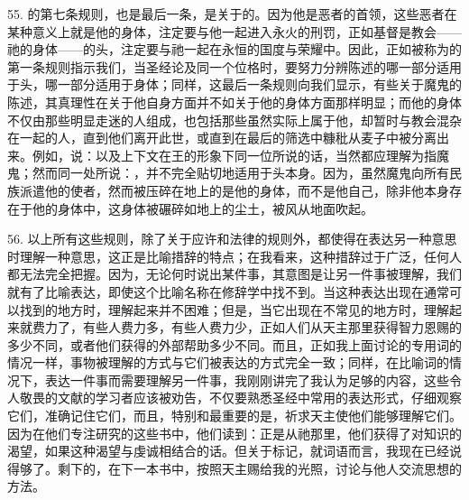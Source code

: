 55. 的第七条规则，也是最后一条，是关于的。因为他是恶者的首领，这些恶者在某种意义上就是他的身体，注定要与他一起进入永火的刑罚，正如基督是教会——祂的身体——的头，注定要与祂一起在永恒的国度与荣耀中。因此，正如被称为的第一条规则指示我们，当圣经论及同一个位格时，要努力分辨陈述的哪一部分适用于头，哪一部分适用于身体；同样，这最后一条规则向我们显示，有些关于魔鬼的陈述，其真理性在关于他自身方面并不如关于他的身体方面那样明显；而他的身体不仅由那些明显走迷的人组成，也包括那些虽然实际上属于他，却暂时与教会混杂在一起的人，直到他们离开此世，或直到在最后的筛选中糠秕从麦子中被分离出来。例如，说：以及上下文在王的形象下同一位所说的话，当然都应理解为指魔鬼；然而同一处所说：，并不完全贴切地适用于头本身。因为，虽然魔鬼向所有民族派遣他的使者，然而被压碎在地上的是他的身体，而不是他自己，除非他本身存在于他的身体中，这身体被碾碎如地上的尘土，被风从地面吹起。\par

56. 以上所有这些规则，除了关于应许和法律的规则外，都使得在表达另一种意思时理解一种意思，这正是比喻措辞的特点；在我看来，这种措辞过于广泛，任何人都无法完全把握。因为，无论何时说出某件事，其意图是让另一件事被理解，我们就有了比喻表达，即使这个比喻名称在修辞学中找不到。当这种表达出现在通常可以找到的地方时，理解起来并不困难；但是，当它出现在不常见的地方时，理解起来就费力了，有些人费力多，有些人费力少，正如人们从天主那里获得智力恩赐的多少不同，或者他们获得的外部帮助多少不同。而且，正如我上面讨论的专用词的情况一样，事物被理解的方式与它们被表达的方式完全一致；同样，在比喻词的情况下，表达一件事而需要理解另一件事，我刚刚讲完了我认为足够的内容，这些令人敬畏的文献的学习者应该被劝告，不仅要熟悉圣经中常用的表达形式，仔细观察它们，准确记住它们，而且，特别和最重要的是，祈求天主使他们能够理解它们。因为在他们专注研究的这些书中，他们读到：正是从祂那里，他们获得了对知识的渴望，如果这种渴望与虔诚相结合的话。但关于标记，就词语而言，我现在已经说得够了。剩下的，在下一本书中，按照天主赐给我的光照，讨论与他人交流思想的方法。\par




